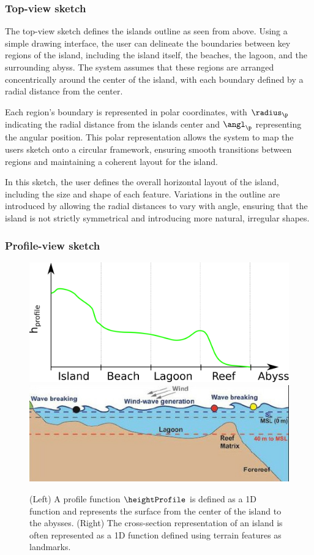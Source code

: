 \subsubsection{Top-view sketch}

The top-view sketch defines the islands outline as seen from above. Using a simple drawing interface, the user can delineate the boundaries between key regions of the island, including the island itself, the beaches, the lagoon, and the surrounding abyss. The system assumes that these regions are arranged concentrically around the center of the island, with each boundary defined by a radial distance from the center.

Each region's boundary is represented in polar coordinates, with $\radius_\p$ indicating the radial distance from the islands center and $\angl_\p$ representing the angular position. This polar representation allows the system to map the users sketch onto a circular framework, ensuring smooth transitions between regions and maintaining a coherent layout for the island.

In this sketch, the user defines the overall horizontal layout of the island, including the size and shape of each feature. Variations in the outline are introduced by allowing the radial distances to vary with angle, ensuring that the island is not strictly symmetrical and introducing more natural, irregular shapes.

\subsubsection{Profile-view sketch}

\begin{figure}[H]
	\centering
	\includegraphics[width=0.45 \linewidth]{profileFunction.pdf}
	\includegraphics[width=0.45 \linewidth]{schema_profile.jpg}
    \caption{(Left) A profile function $\heightProfile$ is defined as a 1D function and represents the surface from the center of the island to the abysses. (Right) The cross-section representation of an island is often represented as a 1D function defined using terrain features as landmarks. }
    \label{fig:coral-island_profile-function}
\end{figure}

